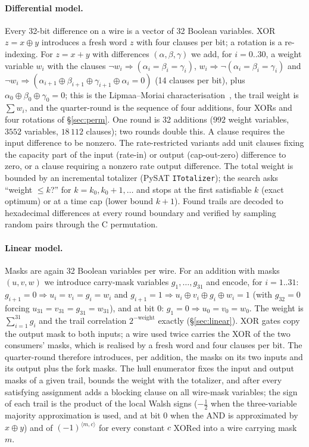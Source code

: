 \documentclass{iacrtrans}
\begin{document}
\paragraph{Differential model.} Every 32-bit difference on a wire is a vector of 32 Boolean variables. XOR $z = x\oplus y$ introduces a fresh word $z$ with four clauses per bit; a rotation is a re-indexing. For $z = x + y$ with differences $(\alpha,\beta,\gamma)$ we add, for $i = 0..30$, a weight variable $w_i$ with the clauses $\neg w_i \Rightarrow (\alpha_i = \beta_i = \gamma_i)$, $w_i \Rightarrow \neg(\alpha_i = \beta_i = \gamma_i)$ and $\neg w_i \Rightarrow (\alpha_{i+1}\oplus\beta_{i+1}\oplus\gamma_{i+1}\oplus\alpha_i = 0)$ (14 clauses per bit), plus $\alpha_0\oplus\beta_0\oplus\gamma_0 = 0$; this is the Lipmaa--Moriai characterisation~\cite{LM01}, the trail weight is $\sum w_i$, and the quarter-round is the sequence of four additions, four XORs and four rotations of \S\ref{sec:perm}. One round is 32 additions ($992$ weight variables, $3552$ variables, $18\,112$ clauses); two rounds double this. A clause requires the input difference to be nonzero. The rate-restricted variants add unit clauses fixing the capacity part of the input (\textsf{rate-in}) or output (\textsf{cap-out-zero}) difference to zero, or a clause requiring a nonzero rate output difference. The total weight is bounded by an incremental totalizer (PySAT \texttt{ITotalizer}); the search asks ``weight $\leq k$?'' for $k = k_0, k_0+1, \ldots$ and stops at the first satisfiable $k$ (exact optimum) or at a time cap (lower bound $k+1$). Found trails are decoded to hexadecimal differences at every round boundary and verified by sampling random pairs through the C permutation.

\paragraph{Linear model.} Masks are again 32 Boolean variables per wire. For an addition with masks $(u,v,w)$ we introduce carry-mask variables $g_1,\ldots,g_{31}$ and encode, for $i = 1..31$: $g_{i+1} = 0 \Rightarrow u_i = v_i = g_i = w_i$ and $g_{i+1} = 1 \Rightarrow u_i\oplus v_i\oplus g_i\oplus w_i = 1$ (with $g_{32} = 0$ forcing $u_{31} = v_{31} = g_{31} = w_{31}$), and at bit 0: $g_1 = 0 \Rightarrow u_0 = v_0 = w_0$. The weight is $\sum_{i=1}^{31} g_i$ and the trail correlation $2^{-\text{weight}}$ exactly (\S\ref{sec:linear}). XOR gates copy the output mask to both inputs; a wire used twice carries the XOR of the two consumers' masks, which is realised by a fresh word and four clauses per bit. The quarter-round therefore introduces, per addition, the masks on its two inputs and its output plus the fork masks. The hull enumerator fixes the input and output masks of a given trail, bounds the weight with the totalizer, and after every satisfying assignment adds a blocking clause on all wire-mask variables; the sign of each trail is the product of the local Walsh signs ($-\tfrac12$ when the three-variable majority approximation is used, and at bit 0 when the AND is approximated by $x\oplus y$) and of $(-1)^{\langle m, c\rangle}$ for every constant $c$ XORed into a wire carrying mask $m$.
\end{document}
